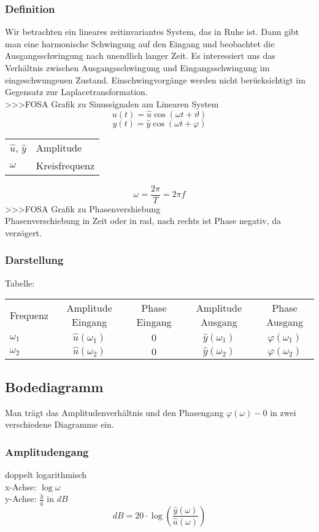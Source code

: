 \subsubsection{Definition}
Wir betrachten ein lineares zeitinvariantes System, das in Ruhe ist. 
Dann gibt man eine harmonische Schwingung auf den Eingang und beobachtet die 
Ausgangsschwingung nach unendlich langer Zeit. Es interessiert uns das 
Verhältnis zwischen Ausgangsschwingung und Eingangsschwingung im 
eingeschwungenen Zustand. Einschwingvorgänge werden nicht berücksichtigt im 
Gegensatz zur Laplacetransformation. \\
>>>FOSA Grafik zu Sinussignalen am Linearen System
\[ u(t) = \hat{u} \cos(\omega t + \vartheta) \]
\[ y(t) = \hat{y} \cos(\omega t + \varphi) \]
\begin{tabular}{ll}
$\hat{u}$, $\hat{y}$ & Amplitude \\
$\omega$          & Kreisfrequenz \\
\end{tabular}
\[ \omega = \frac{2 \pi}{T} = 2 \pi f \]
>>>FOSA Grafik zu Phasenvershiebung\\
Phasenverschiebung in Zeit oder in rad, nach rechts ist Phase negativ, da 
verzögert. 
\subsubsection{Darstellung}
Tabelle: \\
\begin{tabular}{lcccc}
Frequenz   & Amplitude Eingang & Phase Eingang & Amplitude Ausgang & Phase Ausgang \\
$\omega_1$ &
  $\hat{u}(\omega_1)$ &
  $0$ &
  $\hat{y}(\omega_1)$ &
  $\varphi(\omega_1)$ \\
$\omega_2$ &
  $\hat{u}(\omega_2)$ & 
  $0$ & 
  $\hat{y}(\omega_2)$ & 
  $\varphi(\omega_2)$ \\

\end{tabular}

\subsection{Bodediagramm}
Man trägt das Amplitudenverhältnis und den Phasengang $\varphi(\omega) - 0$ 
in zwei verschiedene Diagramme ein. 

\subsubsection{Amplitudengang}
doppelt logarithmisch\\
x-Achse: $\log \omega$ \\
y-Achse: $\frac{\hat{y}}{\hat{u}}$ in $dB$\\
\[ dB = 20 \cdot \log\left( \frac{\hat{y}(\omega)}{\hat{u}(\omega)} \right) \]

